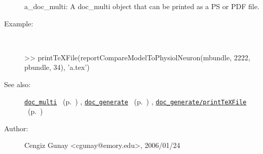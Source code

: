 \begin{description}
	a\_doc\_multi: A doc\_multi object that can be printed as a PS or PDF file.
%
\item[Example:]~
\begin{lyxcode} >> printTeXFile(reportCompareModelToPhysiolNeuron(mbundle, 2222, pbundle, 34), 'a.tex')\\%
\end{lyxcode}
%
\item[See also:]%
\hyperlink{ref_doc_multi}{\texttt{doc\_multi}}%
\ (p.~\pageref{ref_doc_multi})%
%
, \hyperlink{ref_doc_generate}{\texttt{doc\_generate}}%
\ (p.~\pageref{ref_doc_generate})%
%
, \hyperlink{ref_doc_generate__printTeXFile}{\texttt{doc\_generate/printTeXFile}}%
\ (p.~\pageref{ref_doc_generate__printTeXFile})%
%
%
\item[Author:]%
Cengiz Gunay <cgunay@emory.edu>, 2006/01/24%
\end{description}
\methodline%

